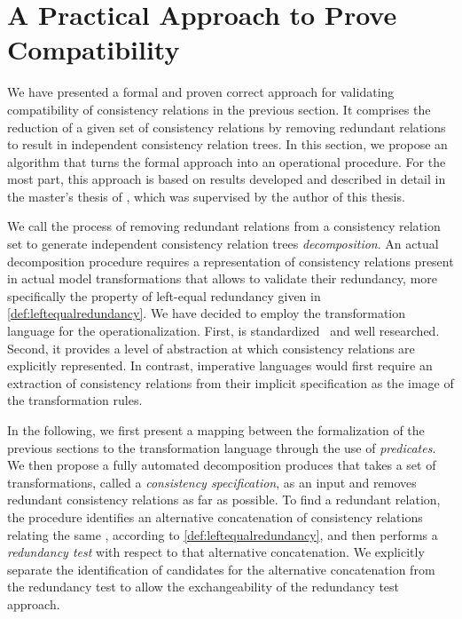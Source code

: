 \section{A Practical Approach to Prove Compatibility}
\label{chap:compatibility:practical_approach}

We have presented a formal and proven correct approach for validating compatibility of consistency relations in the previous section.
It comprises the reduction of a given set of consistency relations by removing redundant relations to result in independent consistency relation trees.
In this section, we propose an algorithm that turns the formal approach into an operational procedure.
For the most part, this approach is based on results developed and described in detail in the master's thesis of \textcite{pepin2019ma}, which was supervised by the author of this thesis.

We call the process of removing redundant relations from a consistency relation set to generate independent consistency relation trees \emph{decomposition}.
An actual decomposition procedure requires a representation of consistency relations present in actual model transformations that allows to validate their redundancy, more specifically the property of left-equal redundancy given in \autoref{def:leftequalredundancy}.
We have decided to employ the transformation language \qvtr for the operationalization.
First, \qvtr is standardized~\cite{qvt} and well researched.
Second, it provides a level of abstraction at which consistency relations are explicitly represented.
In contrast, imperative languages would first require an extraction of consistency relations from their implicit specification as the image of the transformation rules.

In the following, we first present a mapping between the formalization of the previous sections to the \qvtr transformation language through the use of \emph{predicates}.
We then propose a fully automated decomposition produces that takes a set of \qvtr transformations, called a \emph{consistency specification}, as an input and removes redundant consistency relations as far as possible.
To find a redundant relation, the procedure identifies an alternative concatenation of consistency relations relating the same \metaclasses, according to \autoref{def:leftequalredundancy}, and then performs a \emph{redundancy test} with respect to that alternative concatenation.
We explicitly separate the identification of candidates for the alternative concatenation from the redundancy test to allow the exchangeability of the redundancy test approach.


